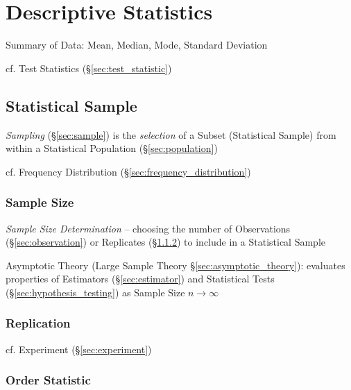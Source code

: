 \section{Descriptive Statistics}\label{sec:descriptive_statistics}

Summary of Data: Mean, Median, Mode, Standard Deviation

cf. Test Statistics (\S\ref{sec:test_statistic})



\subsection{Statistical Sample}\label{sec:statistical_sample}

\emph{Sampling} (\S\ref{sec:sample}) is the \emph{selection} of a Subset
(Statistical Sample) from within a Statistical Population
(\S\ref{sec:population})

\fist cf. Frequency Distribution (\S\ref{sec:frequency_distribution})



\subsubsection{Sample Size}\label{sec:sample_size}

\emph{Sample Size Determination} -- choosing the number of Observations
(\S\ref{sec:observation}) or Replicates (\S\ref{sec:replication}) to include in
a Statistical Sample

\fist Asymptotic Theory (Large Sample Theory \S\ref{sec:asymptotic_theory}):
evaluates properties of Estimators (\S\ref{sec:estimator}) and Statistical Tests
(\S\ref{sec:hypothesis_testing}) as Sample Size $n \rightarrow \infty$



\subsubsection{Replication}\label{sec:replication}

cf. Experiment (\S\ref{sec:experiment})



\subsubsection{Order Statistic}\label{sec:order_statistic}



